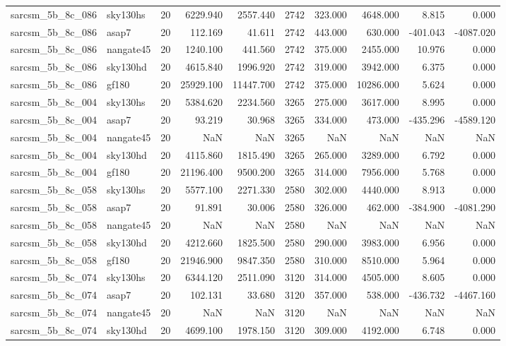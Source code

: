 \begin{tabular}{llrrrrrrrr}
sarcsm\_5b\_8c\_086 & sky130hs & 20 & 6229.940 & 2557.440 & 2742 & 323.000 & 4648.000 & 8.815 & 0.000 \\
sarcsm\_5b\_8c\_086 & asap7 & 20 & 112.169 & 41.611 & 2742 & 443.000 & 630.000 & -401.043 & -4087.020 \\
sarcsm\_5b\_8c\_086 & nangate45 & 20 & 1240.100 & 441.560 & 2742 & 375.000 & 2455.000 & 10.976 & 0.000 \\
sarcsm\_5b\_8c\_086 & sky130hd & 20 & 4615.840 & 1996.920 & 2742 & 319.000 & 3942.000 & 6.375 & 0.000 \\
sarcsm\_5b\_8c\_086 & gf180 & 20 & 25929.100 & 11447.700 & 2742 & 375.000 & 10286.000 & 5.624 & 0.000 \\
sarcsm\_5b\_8c\_004 & sky130hs & 20 & 5384.620 & 2234.560 & 3265 & 275.000 & 3617.000 & 8.995 & 0.000 \\
sarcsm\_5b\_8c\_004 & asap7 & 20 & 93.219 & 30.968 & 3265 & 334.000 & 473.000 & -435.296 & -4589.120 \\
sarcsm\_5b\_8c\_004 & nangate45 & 20 & NaN & NaN & 3265 & NaN & NaN & NaN & NaN \\
sarcsm\_5b\_8c\_004 & sky130hd & 20 & 4115.860 & 1815.490 & 3265 & 265.000 & 3289.000 & 6.792 & 0.000 \\
sarcsm\_5b\_8c\_004 & gf180 & 20 & 21196.400 & 9500.200 & 3265 & 314.000 & 7956.000 & 5.768 & 0.000 \\
sarcsm\_5b\_8c\_058 & sky130hs & 20 & 5577.100 & 2271.330 & 2580 & 302.000 & 4440.000 & 8.913 & 0.000 \\
sarcsm\_5b\_8c\_058 & asap7 & 20 & 91.891 & 30.006 & 2580 & 326.000 & 462.000 & -384.900 & -4081.290 \\
sarcsm\_5b\_8c\_058 & nangate45 & 20 & NaN & NaN & 2580 & NaN & NaN & NaN & NaN \\
sarcsm\_5b\_8c\_058 & sky130hd & 20 & 4212.660 & 1825.500 & 2580 & 290.000 & 3983.000 & 6.956 & 0.000 \\
sarcsm\_5b\_8c\_058 & gf180 & 20 & 21946.900 & 9847.350 & 2580 & 310.000 & 8510.000 & 5.964 & 0.000 \\
sarcsm\_5b\_8c\_074 & sky130hs & 20 & 6344.120 & 2511.090 & 3120 & 314.000 & 4505.000 & 8.605 & 0.000 \\
sarcsm\_5b\_8c\_074 & asap7 & 20 & 102.131 & 33.680 & 3120 & 357.000 & 538.000 & -436.732 & -4467.160 \\
sarcsm\_5b\_8c\_074 & nangate45 & 20 & NaN & NaN & 3120 & NaN & NaN & NaN & NaN \\
sarcsm\_5b\_8c\_074 & sky130hd & 20 & 4699.100 & 1978.150 & 3120 & 309.000 & 4192.000 & 6.748 & 0.000 \\

\end{tabular}
